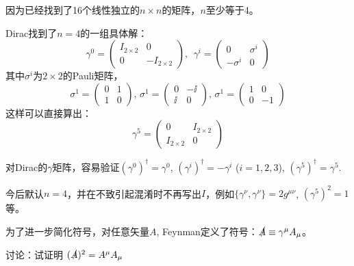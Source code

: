 \documentclass[CJK]{beamer}
\begin{document}
\begin{frame}
\bch
因为已经找到了16个线性独立的$n\times n$的矩阵，$n$至少等于4。

Dirac找到了$n=4$的一组具体解：
\begin{equation}
\gamma^0 = \left(\begin{array}{rr} I_{2\times 2} & 0 \\  0 & -I_{2\times 2} \end{array}\right) ,\ \ 
\gamma^i = \left(\begin{array}{rr} 0 & \sigma^i \\ -\sigma^i &  0 \end{array}\right) \nonumber
\end{equation}
其中$\sigma^i$为$2\times 2$的Pauli矩阵，
\begin{equation}
\sigma^1 = \left(\begin{array}{rr} 0 & 1 \\ 1 & 0 \end{array} \right),\, 
\sigma^1 = \left(\begin{array}{rr} 0 & -\ii \\ \ii & 0 \end{array} \right),\, 
\sigma^1 = \left(\begin{array}{rr} 1 & 0 \\ 0 & -1 \end{array} \right) 
\end{equation}
这样可以直接算出：
\begin{equation}
\gamma^5 = \left(\begin{array}{rr} 0 & I_{2\times 2} \\  I_{2\times 2} & 0 \end{array}\right) \nonumber
\end{equation}

对Dirac的$\gamma$矩阵，容易验证$(\gamma^0)^\dagger = \gamma^0$, $(\gamma^i)^\dagger = - \gamma^i$ ($i=1,2,3$), $(\gamma^5)^\dagger = \gamma^5$.
\ech
\end{frame}


\begin{frame}
\bch
今后默认$n=4$，并在不致引起混淆时不再写出$I$，例如$\{\gamma^\nu, \gamma^\nu\} = 2 g^{\mu\nu}$, $(\gamma^5)^2 = 1$等。

\skipline

为了进一步简化符号，对任意矢量$A$, Feynman定义了符号：$\slashed{A} \equiv \gamma^\mu A_\mu$。

\skipline

讨论：试证明 $(\slashed{A})^2 = A^\mu A_\mu $

\ech
\end{frame}
\end{document}
